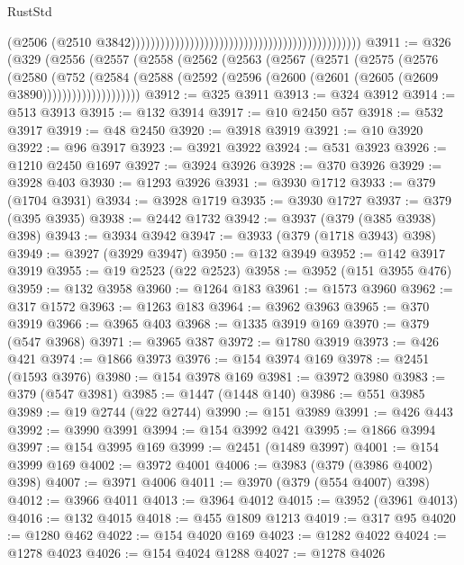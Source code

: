 \begin{lexlean}{RustStd}
\begin{coremodule}
                                                                                              (@2506
                                                                                                (@2510
                                                                                                  @3842)))))))))))))))))))))))))))))))))))))))))))))))
@3911 := @326
    (@329
      (@2556
        (@2557
          (@2558
            (@2562
              (@2563
                (@2567
                  (@2571
                    (@2575
                      (@2576
                        (@2580
                          (@752
                            (@2584
                              (@2588
                                (@2592 (@2596 (@2600 (@2601 (@2605 (@2609 @3890))))))))))))))))))))
@3912 := @325 @3911
@3913 := @324 @3912
@3914 := @513 @3913
@3915 := @132 @3914
@3917 := @10 @2450 @57
@3918 := @532 @3917
@3919 := @48 @2450
@3920 := @3918 @3919
@3921 := @10 @3920
@3922 := @96 @3917
@3923 := @3921 @3922
@3924 := @531 @3923
@3926 := @1210 @2450 @1697
@3927 := @3924 @3926
@3928 := @370 @3926
@3929 := @3928 @403
@3930 := @1293 @3926
@3931 := @3930 @1712
@3933 := @379 (@1704 @3931)
@3934 := @3928 @1719
@3935 := @3930 @1727
@3937 := @379 (@395 @3935)
@3938 := @2442 @1732
@3942 := @3937 (@379 (@385 @3938) @398)
@3943 := @3934 @3942
@3947 := @3933 (@379 (@1718 @3943) @398)
@3949 := @3927 (@3929 @3947)
@3950 := @132 @3949
@3952 := @142 @3917 @3919
@3955 := @19 @2523 (@22 @2523)
@3958 := @3952 (@151 @3955 @476)
@3959 := @132 @3958
@3960 := @1264 @183
@3961 := @1573 @3960
@3962 := @317 @1572
@3963 := @1263 @183
@3964 := @3962 @3963
@3965 := @370 @3919
@3966 := @3965 @403
@3968 := @1335 @3919 @169
@3970 := @379 (@547 @3968)
@3971 := @3965 @387
@3972 := @1780 @3919
@3973 := @426 @421
@3974 := @1866 @3973
@3976 := @154 @3974 @169
@3978 := @2451 (@1593 @3976)
@3980 := @154 @3978 @169
@3981 := @3972 @3980
@3983 := @379 (@547 @3981)
@3985 := @1447 (@1448 @140)
@3986 := @551 @3985
@3989 := @19 @2744 (@22 @2744)
@3990 := @151 @3989
@3991 := @426 @443
@3992 := @3990 @3991
@3994 := @154 @3992 @421
@3995 := @1866 @3994
@3997 := @154 @3995 @169
@3999 := @2451 (@1489 @3997)
@4001 := @154 @3999 @169
@4002 := @3972 @4001
@4006 := @3983 (@379 (@3986 @4002) @398)
@4007 := @3971 @4006
@4011 := @3970 (@379 (@554 @4007) @398)
@4012 := @3966 @4011
@4013 := @3964 @4012
@4015 := @3952 (@3961 @4013)
@4016 := @132 @4015
@4018 := @455 @1809 @1213
@4019 := @317 @95
@4020 := @1280 @462
@4022 := @154 @4020 @169
@4023 := @1282 @4022
@4024 := @1278 @4023
@4026 := @154 @4024 @1288
@4027 := @1278 @4026

\end{coremodule}
\end{lexlean}
